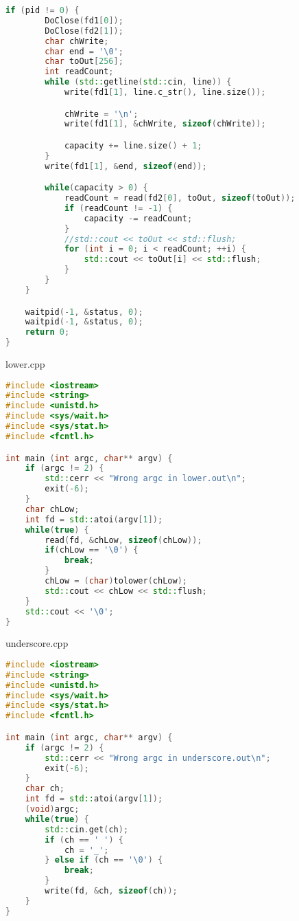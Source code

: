 \documentclass[a4paper, 12pt]{article}
\begin{document}
\begin{lstlisting}[language=C++]
    if (pid != 0) {
        DoClose(fd1[0]);
        DoClose(fd2[1]);
        char chWrite;
        char end = '\0';
        char toOut[256];
        int readCount;
        while (std::getline(std::cin, line)) {
            write(fd1[1], line.c_str(), line.size());

            chWrite = '\n';
            write(fd1[1], &chWrite, sizeof(chWrite));

            capacity += line.size() + 1;
        }
        write(fd1[1], &end, sizeof(end));

        while(capacity > 0) {
            readCount = read(fd2[0], toOut, sizeof(toOut));
            if (readCount != -1) {
                capacity -= readCount;
            }
            //std::cout << toOut << std::flush;
            for (int i = 0; i < readCount; ++i) {
                std::cout << toOut[i] << std::flush;
            }   
        }
    }

    waitpid(-1, &status, 0);
    waitpid(-1, &status, 0);
    return 0;
}

\end{lstlisting}

lower.cpp
\begin{lstlisting}[language=C++]
#include <iostream>
#include <string>
#include <unistd.h>
#include <sys/wait.h>
#include <sys/stat.h>
#include <fcntl.h>

int main (int argc, char** argv) {
    if (argc != 2) {
        std::cerr << "Wrong argc in lower.out\n";
        exit(-6);
    }
    char chLow;
    int fd = std::atoi(argv[1]);
    while(true) {
        read(fd, &chLow, sizeof(chLow));
        if(chLow == '\0') {
            break;
        }
        chLow = (char)tolower(chLow);
        std::cout << chLow << std::flush;
    }
    std::cout << '\0';
}
\end{lstlisting}

underscore.cpp
\begin{lstlisting}[language=C++]
#include <iostream>
#include <string>
#include <unistd.h>
#include <sys/wait.h>
#include <sys/stat.h>
#include <fcntl.h>

int main (int argc, char** argv) {
    if (argc != 2) {
        std::cerr << "Wrong argc in underscore.out\n";
        exit(-6);
    }
    char ch;
    int fd = std::atoi(argv[1]);
    (void)argc;
    while(true) {
        std::cin.get(ch);
        if (ch == ' ') {
            ch = '_';
        } else if (ch == '\0') {
            break;
        }
        write(fd, &ch, sizeof(ch));
    }
}

\end{lstlisting}
\end{document}
